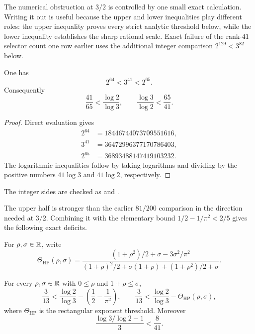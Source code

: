 \documentclass[11pt]{article}
\begin{document}
The numerical obstruction at $3/2$ is controlled by one small exact
calculation.  Writing it out is useful because the upper and lower inequalities
play different roles: the upper inequality proves every strict analytic
threshold below, while the lower inequality establishes the sharp rational
scale.  Exact failure of the rank-$41$ selector count one row earlier uses the
additional integer comparison $2^{129}<3^{82}$ below.

\begin{theorem}\label{long1049:res:powerbracket}
One has
\[
 2^{64}<3^{41}<2^{65}.
\]
Consequently
\[
 \frac{41}{65}<\frac{\log2}{\log3},
 \qquad
 \frac{\log3}{\log2}<\frac{65}{41}.
\]
\end{theorem}

\begin{proof}
Direct evaluation gives
\[
 \begin{aligned}
 2^{64}&=18446744073709551616,\\
 3^{41}&=36472996377170786403,\\
 2^{65}&=36893488147419103232.
 \end{aligned}
\]
The logarithmic inequalities follow by taking logarithms and dividing by the
positive numbers $41\log3$ and $41\log2$, respectively.
\end{proof}

\noindent The integer sides are checked as
and
.

The upper half is stronger than the earlier $81/200$ comparison in the
direction needed at $3/2$.  Combining it with the elementary bound
$1/2-1/\pi^2<2/5$ gives the following exact deficits.

For $\rho,\sigma\in\mathbb{R}$, write
\[
 \Theta_{\mathrm{HP}}(\rho,\sigma)=
 \frac{(1+\rho^2)/2+\sigma-3\sigma^2/\pi^2}
 {(1+\rho)^2/2+\sigma(1+\rho)+(1+\rho^2)/2+\sigma}.
\]

\begin{corollary}\label{long1049:res:sharpgaps}
For every $\rho,\sigma\in\mathbb{R}$ with $0\le\rho$ and $1+\rho\le\sigma$,
\[
 \frac3{13}<\frac{\log2}{\log3}
   -\left(\frac12-\frac1{\pi^2}\right),
 \qquad
 \frac3{13}<\frac{\log2}{\log3}-\Theta_{\mathrm{HP}}(\rho,\sigma),
\]
where $\Theta_{\mathrm{HP}}$ is the rectangular exponent threshold.  Moreover
\[
 \frac{\log3/\log2-1}{3}<\frac8{41}.
\]
\end{corollary}
\end{document}

